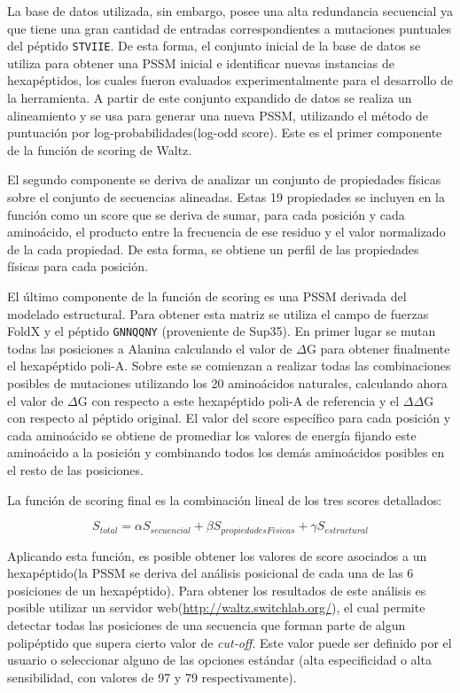La base de datos utilizada, sin embargo, posee una alta redundancia secuencial ya que tiene una gran cantidad de entradas correspondientes a mutaciones puntuales del péptido \texttt{STVIIE}.
De esta forma, el conjunto inicial de la base de datos se utiliza para obtener una PSSM inicial e identificar nuevas instancias de hexapéptidos, los cuales fueron evaluados experimentalmente para el desarrollo de la herramienta.
A partir de este conjunto expandido de datos se realiza un alineamiento y se usa para generar una nueva PSSM, utilizando el método de puntuación por log-probabilidades(log-odd score).
Este es el primer componente de la función de scoring de Waltz.

El segundo componente se deriva de analizar un conjunto de propiedades físicas sobre el conjunto de secuencias alineadas.
Estas 19 propiedades se incluyen en la función como un score que se deriva de sumar, para cada posición y cada aminoácido, el producto entre la frecuencia de ese residuo
y el valor normalizado de la cada propiedad. De esta forma, se obtiene un perfil de las propiedades físicas para cada posición.


El último componente de la función de scoring es una PSSM derivada del modelado estructural. 
Para obtener esta matriz se utiliza el campo de fuerzas FoldX y el péptido \texttt{GNNQQNY} (proveniente de Sup35).
En primer lugar se mutan todas las posiciones a Alanina calculando el valor de $\Delta$G para obtener finalmente el hexapéptido poli-A.
Sobre este se comienzan a realizar todas las combinaciones posibles de mutaciones utilizando los 20 aminoácidos naturales, calculando ahora el valor de $\Delta$G con respecto a este hexapéptido poli-A de referencia y 
el $\Delta\Delta$G con respecto al péptido original. 
El valor del score específico para cada posición y cada aminoácido se obtiene de promediar los valores de energía fijando este aminoácido a la posición y combinando todos los demás aminoácidos posibles en el resto de las posiciones.


La función de scoring final es la combinación lineal de los tres scores detallados:

{
\large
\begin{equation}
S_{total}= \alpha S_{secuencial} + \beta S_{propiedadesFisicas} + \gamma S_{estructural}
\end{equation}
}

Aplicando esta función, es posible obtener los valores de score asociados a un hexapéptido(la PSSM se deriva del análisis posicional de cada una de las 6 posiciones de un hexapéptido).
Para obtener los resultados de este análisis es posible utilizar un servidor web(\url{http://waltz.switchlab.org/}), el cual permite detectar todas las posiciones de una secuencia que forman parte de algun polipéptido que supera cierto
valor de \textit{cut-off}. Este valor puede ser definido por el usuario o seleccionar alguno de las opciones estándar (alta especificidad o alta sensibilidad, con valores de 97 y 79 respectivamente).

